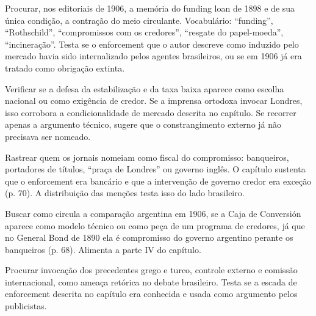 \begin{dialogo}
\item Procurar, nos editoriais de 1906, a memória do funding loan de 1898 e de
sua única condição, a contração do meio circulante. Vocabulário: ``funding'',
``Rothschild'', ``compromissos com os credores'', ``resgate do papel-moeda'',
``incineração''. Testa se o enforcement que o autor descreve como induzido pelo
mercado havia sido internalizado pelos agentes brasileiros, ou se em 1906 já era
tratado como obrigação extinta.
\item Verificar se a defesa da estabilização e da taxa baixa aparece como
escolha nacional ou como exigência de credor. Se a imprensa ortodoxa invocar
Londres, isso corrobora a condicionalidade de mercado descrita no capítulo. Se
recorrer apenas a argumento técnico, sugere que o constrangimento externo já não
precisava ser nomeado.
\item Rastrear quem os jornais nomeiam como fiscal do compromisso: banqueiros,
portadores de títulos, ``praça de Londres'' ou governo inglês. O capítulo
sustenta que o enforcement era bancário e que a intervenção de governo credor
era exceção (p. 70). A distribuição das menções testa isso do lado brasileiro.
\item Buscar como circula a comparação argentina em 1906, se a Caja de
Conversión aparece como modelo técnico ou como peça de um programa de credores,
já que no General Bond de 1890 ela é compromisso do governo argentino perante os
banqueiros (p. 68). Alimenta a parte IV do capítulo.
\item Procurar invocação dos precedentes grego e turco, controle externo e
comissão internacional, como ameaça retórica no debate brasileiro. Testa se a
escada de enforcement descrita no capítulo era conhecida e usada como argumento
pelos publicistas.
\end{dialogo}

